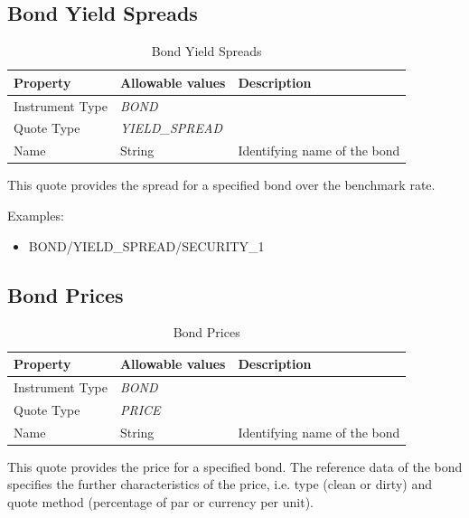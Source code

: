 \subsection{Bond Yield Spreads}

\begin{table}[H]
\centering
  \begin{tabular}{|p{3cm}|p{3.5cm}|p{7cm}|}
  \hline
  {\bf Property} & {\bf Allowable values} & {\bf Description} \\ \hline
    Instrument Type & \emph{BOND} & \\ \hline
    Quote Type & \emph{YIELD\_SPREAD} & \\ \hline
    Name & String & Identifying name of the bond \\ \hline
  \end{tabular}
  \caption{Bond Yield Spreads}
  \label{tab:bondyieldspread_quote}
\end{table}

This quote provides the spread for a specified bond over the benchmark rate.

\medskip
Examples:
\begin{itemize}
	\item BOND/YIELD\_SPREAD/SECURITY\_1
\end{itemize}

\subsection{Bond Prices}

\begin{table}[H]
\centering
  \begin{tabular}{|p{3cm}|p{3.5cm}|p{7cm}|}
  \hline
  {\bf Property} & {\bf Allowable values} & {\bf Description} \\ \hline
    Instrument Type & \emph{BOND} & \\ \hline
    Quote Type & \emph{PRICE} & \\ \hline
    Name & String & Identifying name of the bond \\ \hline
  \end{tabular}
  \caption{Bond Prices}
  \label{tab:bondprice_quote}
\end{table}

This quote provides the price for a specified bond. The reference data of the bond specifies the further characteristics
of the price, i.e. type (clean or dirty) and quote method (percentage of par or currency per unit).

